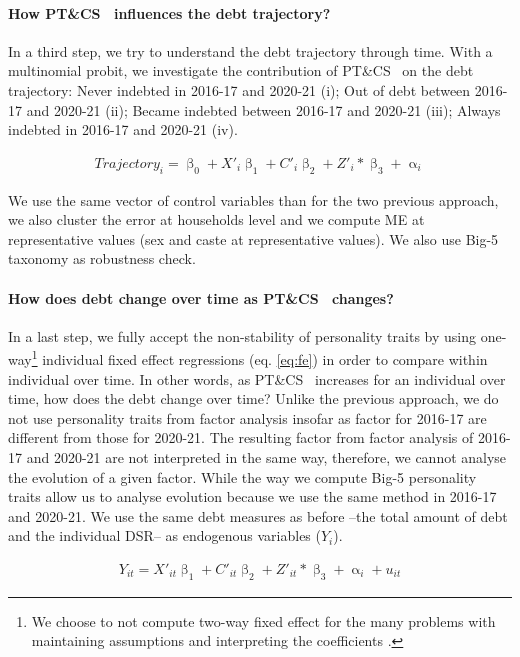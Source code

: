 \documentclass[a4paper, 11pt, onecolumn]{article}
\newcommand{\PTCS}{PT\&CS}
\begin{document}
\paragraph{How \PTCS~ influences the debt trajectory?}
In a third step, we try to understand the debt trajectory through time.
With a multinomial probit, we investigate the contribution of \PTCS~ on the debt trajectory: Never indebted in 2016-17 and 2020-21 (i); Out of debt between 2016-17 and 2020-21 (ii); Became indebted between 2016-17 and 2020-21 (iii); Always indebted in 2016-17 and 2020-21 (iv).

\begin{equation}\label{eq:mprobit}
\begin{split}
Trajectory_{i}=\upbeta_{0}+X'_{i}\upbeta_{1}+C'_{i}\upbeta_{2}+Z'_{i}*\upbeta_{3}+\upalpha_{i}
\end{split}
\end{equation}

We use the same vector of control variables than for the two previous approach, we also cluster the error at households level and we compute ME at representative values (sex and caste at representative values).
We also use Big-5 taxonomy as robustness check.

\paragraph{How does debt change over time as \PTCS~ changes?}
In a last step, we fully accept the non-stability of personality traits by using one-way\footnote{We choose to not compute two-way fixed effect for the many problems with maintaining assumptions and interpreting the coefficients \citep{Kropko2020,Imai2020}.} individual fixed effect regressions (eq. \ref{eq:fe}) in order to compare within individual over time.
In other words, as \PTCS~ increases for an individual over time, how does the debt change over time?
Unlike the previous approach, we do not use personality traits from factor analysis insofar as factor for 2016-17 are different from those for 2020-21.
The resulting factor from factor analysis of 2016-17 and 2020-21 are not interpreted in the same way, therefore, we cannot analyse the evolution of a given factor.
While the way we compute Big-5 personality traits allow us to analyse evolution because we use the same method in 2016-17 and 2020-21.
We use the same debt measures as before --the total amount of debt and the individual DSR-- as endogenous variables ($Y_{i}$). 

\begin{equation}\label{eq:fe}
\begin{split}
Y_{it}=X'_{it}\upbeta_{1}+C'_{it}\upbeta_{2}+Z'_{it}*\upbeta_{3}+\upalpha_{i}+u_{it}
\end{split}
\end{equation}
\end{document}
